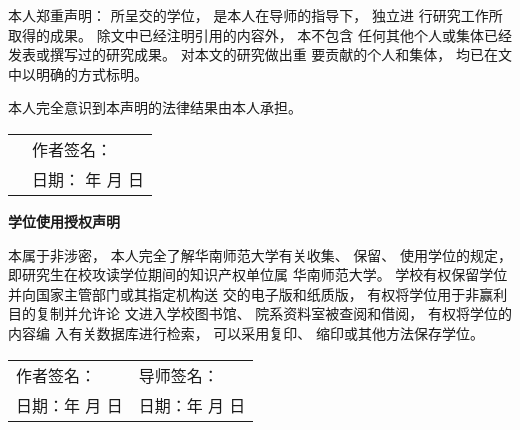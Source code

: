 \begin{statement}
	
\vspace{0.4cm} %
本人郑重声明： 所呈交的学位， 是本人在导师的指导下， 独立进
行研究工作所取得的成果。 除文中已经注明引用的内容外， 本不包含
任何其他个人或集体已经发表或撰写过的研究成果。 对本文的研究做出重
要贡献的个人和集体， 均已在文中以明确的方式标明。

本人完全意识到本声明的法律结果由本人承担。\\

\noindent
\renewcommand{\arraystretch}{1.35}							
\begin{tabular}{p{9cm}p{9cm}}%
	& {\xiaosi\songti 作者签名：} \\
	& {\xiaosi\songti 日期： \qquad 年 \qquad 月 \qquad 日}
\end{tabular}
\par

\vspace{2cm} %
\begin{center}
	\textbf{\songti 学位使用授权声明}\\
\end{center}

\indent
本属于非涉密， 本人完全了解华南师范大学有关收集、 保留、
使用学位的规定， 即研究生在校攻读学位期间的知识产权单位属
华南师范大学。 学校有权保留学位并向国家主管部门或其指定机构送
交的电子版和纸质版， 有权将学位用于非赢利目的复制并允许论
文进入学校图书馆、 院系资料室被查阅和借阅， 有权将学位的内容编
入有关数据库进行检索， 可以采用复印、 缩印或其他方法保存学位。\\

\noindent
\renewcommand{\arraystretch}{1.35}				
{			
\begin{tabular}{p{9cm}p{9cm}}%
	{\xiaosi\songti 作者签名：} & {\xiaosi\songti 导师签名：} \\
	{\xiaosi\songti 日期：\qquad 年 \qquad 月 \qquad 日} & {\xiaosi\songti 日期：\qquad 年 \qquad 月 \qquad 日}
\end{tabular}}\par
					
\end{statement}